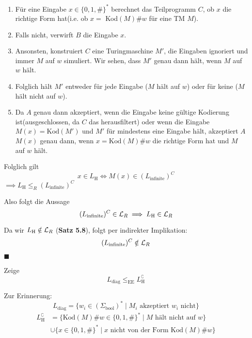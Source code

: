             
                \begin{enumerate}[label=\Roman*.]
                    \item Für eine Eingabe $x \in \{0,1,\#\}^*$ berechnet das Teilprogramm $C$, ob $x$ die richtige Form hat(i.e. ob $x = $ Kod$(M)\#w$ für eine TM $M$).
                    \item Falls nicht, verwirft $B$ die Eingabe $x$.
                    
                    \item Ansonsten, konstruiert $C$ eine Turingmaschine $M'$, die Eingaben ignoriert und immer $M$ auf $w$ simuliert. Wir sehen, dass $M'$ genau dann hält, wenn $M$ auf $w$ hält. 
                    \item Folglich hält $M'$ entweder für jede Eingabe ($M$ hält auf $w$) oder für keine ($M$ hält nicht auf $w$).
                     
                    \item Da $A$ genau dann akzeptiert, wenn die Eingabe keine gültige Kodierung ist(ausgeschlossen, da $C$ das herausfiltert) oder wenn die Eingabe $M(x)= \text{Kod}(M')$ und $M'$ für mindestens eine Eingabe hält, akzeptiert $A$ $M(x)$ genau dann, wenn $x = \text{Kod}(M)\#w$ die richtige Form hat und $M$ auf $w$ hält.
                \end{enumerate}
                
                
                Folglich gilt $$x \in L_{\text{H}} \iff M(x) \in (L_{\text{infinite}})^C$$
                $\implies L_{\text{H}} \leq_R (L_{\text{infinite}})^C$ 
            
                Also folgt die Aussage
                $$(L_{\text{infinite}})^C \in \mathcal{L}_R \implies L_{\text{H}} \in \mathcal{L}_R$$
            
                Da wir $L_{\text{H}} \notin \mathcal{L}_R$ (\textbf{Satz 5.8}), folgt per indirekter Implikation:
                $$(L_{\text{infinite}})^C \notin \mathcal{L}_R$$
            
                \hspace*{0pt}\hfill$\blacksquare$


                    Zeige 
                    $$L_{\text{diag}} \leq_{\text{EE}} L_{\text{H}}^\complement$$
                    
                    Zur Erinnerung:
                    $$L_{\text{diag}} = \{w_i \in (\Sigma_{\text{bool}})^* \mid M_i \text{ akzeptiert } w_i \text{ nicht}\}$$
                    \begin{align*}
                        L_{\text{H}}^\complement &= \{\text{Kod}(M)\#w \in \{0,1 , \#\}^* \mid M \text{ hält nicht auf }w\}\\
                                                & \cup \{x \in \{0, 1, \#\}^* \mid x \text{ nicht von der Form Kod}(M)\#w\}
                    \end{align*}
                
